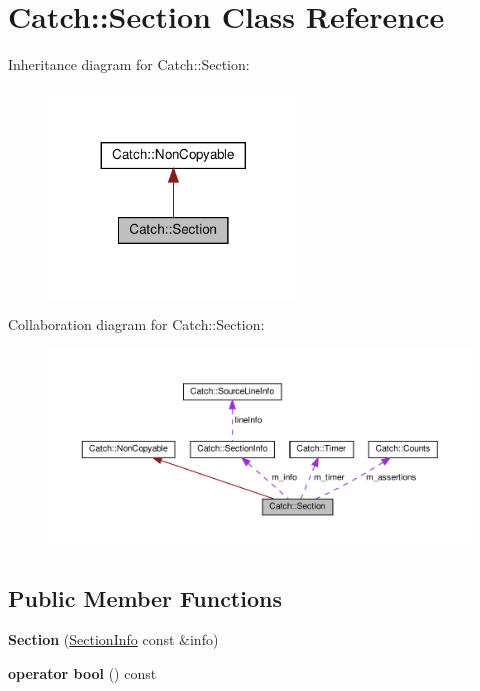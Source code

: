 \hypertarget{classCatch_1_1Section}{}\section{Catch\+:\+:Section Class Reference}
\label{classCatch_1_1Section}


Inheritance diagram for Catch\+:\+:Section\+:
\nopagebreak
\begin{figure}[H]
\begin{center}
\leavevmode
\includegraphics[width=188pt]{classCatch_1_1Section__inherit__graph}
\end{center}
\end{figure}


Collaboration diagram for Catch\+:\+:Section\+:
\nopagebreak
\begin{figure}[H]
\begin{center}
\leavevmode
\includegraphics[width=350pt]{classCatch_1_1Section__coll__graph}
\end{center}
\end{figure}
\subsection*{Public Member Functions}
\begin{DoxyCompactItemize}
\item 
\mbox{\label{classCatch_1_1Section_a68fd4e51e8981aaa7ddb00d8a6abd099}} 
{\bfseries Section} (\hyperlink{structCatch_1_1SectionInfo}{Section\+Info} const \&info)
\item 
\mbox{\label{classCatch_1_1Section_a0632b804dcea1417a2970620a9742eb3}} 
{\bfseries operator bool} () const
\end{DoxyCompactItemize}
